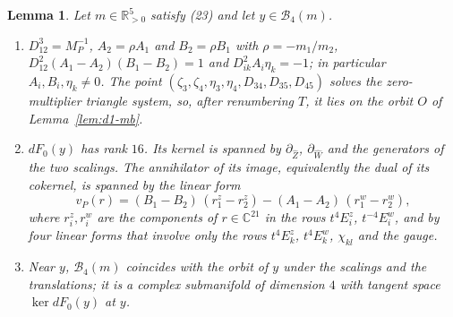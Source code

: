 \documentclass[Threeside,11pt]{article}
\newtheorem{lemma}[theorem]{Lemma}
\theoremstyle{definition}
\theoremstyle{remark}
\numberwithin{equation}{section}
\newcommand{\C}{\mathbb C}\newcommand{\T}{\mathbb T}
\theoremstyle{remark}
\newcommand{\Rp}{\mathbb{R}_{>0}}
\newenvironment{alphalist}{\begin{enumerate}\renewcommand{\labelenumi}{(\alph{enumi})}%
  \renewcommand{\theenumi}{\alph{enumi}}}{\end{enumerate}}
\begin{document}
\begin{lemma}\label{lem:d4-fibre}
Let $m\in\Rp^5$ satisfy (23) and let $y\in\mathcal B_4(m)$.
\begin{alphalist}
  \item $D_{12}^3=M_P^{-1}$, $A_2=\rho A_1$ and $B_2=\rho B_1$ with $\rho=-m_1/m_2$,
  $D_{12}^2(A_1-A_2)(B_1-B_2)=1$ and $D_{ik}^2A_i\eta_k=-1$; in particular $A_i,B_i,\eta_k\ne0$.
  The point $(\zeta_3,\zeta_4,\eta_3,\eta_4,D_{34},D_{35},D_{45})$ solves the zero-multiplier
  triangle system, so, after renumbering $T$, it lies on the orbit $O$ of Lemma~\ref{lem:d1-mb}.
  \item $dF_0(y)$ has rank $16$.  Its kernel is spanned by $\partial_{\hat Z}$, $\partial_{\hat W}$
  {and the generators of the two scalings.  The annihilator of its image, equivalently the
dual of its cokernel, is spanned by the linear form}
  \[
    v_P(r)=(B_1-B_2)\,(r^z_1-r^z_2)-(A_1-A_2)\,(r^w_1-r^w_2),
  \]
  where $r^z_i,r^w_i$ are the components of $r\in\C^{21}$ in the rows $t^4E^z_i$, $t^{-4}E^w_i$, and
  by four linear forms that involve only the rows $t^4E^z_k$, $t^4E^w_k$, $\chi_{kl}$ and the gauge.
  \item Near $y$, $\mathcal B_4(m)$ coincides with the orbit of $y$ under the scalings and
  the translations; it is a complex submanifold of dimension $4$ with tangent space
  $\ker dF_0(y)$ at $y$.
\end{alphalist}
\end{lemma}
\end{document}
